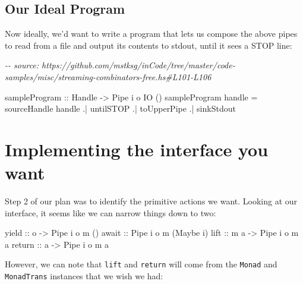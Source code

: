 \documentclass[]{article}
\newenvironment{Shaded}{}{}
\newcommand{\CommentTok}[1]{\textcolor[rgb]{0.38,0.63,0.69}{\textit{#1}}}
\newcommand{\DataTypeTok}[1]{\textcolor[rgb]{0.56,0.13,0.00}{#1}}
\newcommand{\FunctionTok}[1]{\textcolor[rgb]{0.02,0.16,0.49}{#1}}
\newcommand{\NormalTok}[1]{#1}
\newcommand{\OperatorTok}[1]{\textcolor[rgb]{0.40,0.40,0.40}{#1}}
\newcommand{\OtherTok}[1]{\textcolor[rgb]{0.00,0.44,0.13}{#1}}
\begin{document}
\hypertarget{our-ideal-program}{%
\subsection{Our Ideal Program}\label{our-ideal-program}}

Now ideally, we'd want to write a program that lets us compose the above pipes
to read from a file and output its contents to stdout, until it sees a STOP
line:

\begin{Shaded}
\begin{Highlighting}[]
\CommentTok{{-}{-} source: https://github.com/mstksg/inCode/tree/master/code{-}samples/misc/streaming{-}combinators{-}free.hs\#L101{-}L106}

\OtherTok{sampleProgram ::} \DataTypeTok{Handle} \OtherTok{{-}>} \DataTypeTok{Pipe}\NormalTok{ i o }\DataTypeTok{IO}\NormalTok{ ()}
\NormalTok{sampleProgram handle }\OtherTok{=}
\NormalTok{       sourceHandle handle}
    \OperatorTok{.|}\NormalTok{ untilSTOP}
    \OperatorTok{.|}\NormalTok{ toUpperPipe}
    \OperatorTok{.|}\NormalTok{ sinkStdout}
\end{Highlighting}
\end{Shaded}

\hypertarget{implementing-the-interface-you-want}{%
\section{Implementing the interface you
want}\label{implementing-the-interface-you-want}}

Step 2 of our plan was to identify the primitive actions we want. Looking at our
interface, it seems like we can narrow things down to two:

\begin{Shaded}
\begin{Highlighting}[]
\OtherTok{yield  ::}\NormalTok{ o }\OtherTok{{-}>} \DataTypeTok{Pipe}\NormalTok{ i o m ()}
\OtherTok{await  ::} \DataTypeTok{Pipe}\NormalTok{ i o m (}\DataTypeTok{Maybe}\NormalTok{ i)}
\OtherTok{lift   ::}\NormalTok{ m a }\OtherTok{{-}>} \DataTypeTok{Pipe}\NormalTok{ i o m a}
\FunctionTok{return}\OtherTok{ ::}\NormalTok{ a   }\OtherTok{{-}>} \DataTypeTok{Pipe}\NormalTok{ i o m a}
\end{Highlighting}
\end{Shaded}

However, we can note that \texttt{lift} and \texttt{return} will come from the
\texttt{Monad} and \texttt{MonadTrans} instances that we wish we had:
\end{document}
